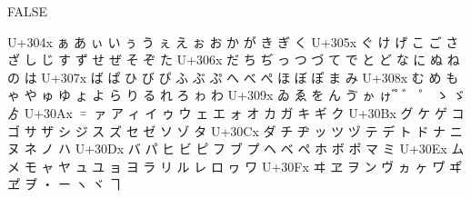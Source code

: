 \documentclass{ltjarticle}\usepackage{luatexja-adjust}
\begin{document}
\par
\newpage\ltjenableadjust[combinevoicedkana=false] FALSE
{\obeylines\ttfamily
U+304x          ぁ      あ      ぃ      い      ぅ      う      ぇ      え      ぉ      お      か      が      き      ぎ      く
U+305x  ぐ      け      げ      こ      ご      さ      ざ      し      じ      す      ず      せ      ぜ      そ      ぞ      た
U+306x  だ      ち      ぢ      っ      つ      づ      て      で      と      ど      な      に      ぬ      ね      の      は
U+307x  ば      ぱ      ひ      び      ぴ      ふ      ぶ      ぷ      へ      べ      ぺ      ほ      ぼ      ぽ      ま      み
U+308x  む      め      も      ゃ      や      ゅ      ゆ      ょ      よ      ら      り      る      れ      ろ      ゎ      わ
U+309x  ゐ      ゑ      を      ん      ゔ      ゕ      ゖ                      ゙        ゚        ゛      ゜      ゝ      ゞ      ゟ 
U+30Ax  ゠      ァ      ア      ィ      イ      ゥ      ウ      ェ      エ      ォ      オ      カ      ガ      キ      ギ      ク
U+30Bx  グ      ケ      ゲ      コ      ゴ      サ      ザ      シ      ジ      ス      ズ      セ      ゼ      ソ      ゾ      タ
U+30Cx  ダ      チ      ヂ      ッ      ツ      ヅ      テ      デ      ト      ド      ナ      ニ      ヌ      ネ      ノ      ハ
U+30Dx  バ      パ      ヒ      ビ      ピ      フ      ブ      プ      ヘ      ベ      ペ      ホ      ボ      ポ      マ      ミ
U+30Ex  ム      メ      モ      ャ      ヤ      ュ      ユ      ョ      ヨ      ラ      リ      ル      レ      ロ      ヮ      ワ
U+30Fx  ヰ      ヱ      ヲ      ン      ヴ      ヵ      ヶ      ワ゚      ヰ゚      ヱ゚      ヲ゚      ・      ー      ヽ      ヾ      ヿ 
\par}
\end{document}
